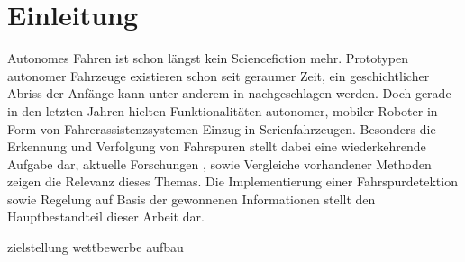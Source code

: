 \chapter{Einleitung \dcsecondauthorshort}

Autonomes Fahren ist schon längst kein Sciencefiction mehr. Prototypen autonomer Fahrzeuge existieren schon seit geraumer Zeit, ein geschichtlicher Abriss der Anfänge kann unter anderem in \autocite[41-67]{kroegerAutomatisierteFahrenIm2015} nachgeschlagen werden. Doch gerade in den letzten Jahren hielten Funktionalitäten autonomer, mobiler Roboter in Form von Fahrerassistenzsystemen Einzug in Serienfahrzeugen. Besonders die Erkennung und Verfolgung von Fahrspuren stellt dabei eine wiederkehrende Aufgabe dar, aktuelle Forschungen \autocite{kunzeReadingLanesRoad2018}, sowie Vergleiche vorhandener Methoden \autocite{naroteReviewRecentAdvances2018} zeigen die Relevanz dieses Themas. Die Implementierung einer Fahrspurdetektion sowie Regelung auf Basis der gewonnenen Informationen stellt den Hauptbestandteil dieser Arbeit dar.


{zielstellung}
{wettbewerbe}
{aufbau}